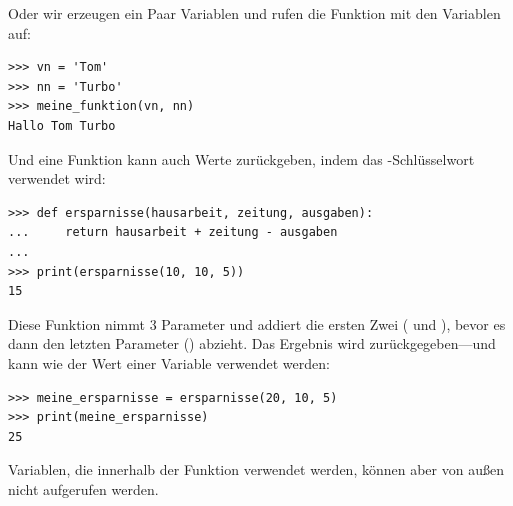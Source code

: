 \noindent
Oder wir erzeugen ein Paar Variablen und rufen die Funktion mit den Variablen auf:

\begin{Verbatim}[frame=single]
>>> vn = 'Tom'
>>> nn = 'Turbo'
>>> meine_funktion(vn, nn)
Hallo Tom Turbo
\end{Verbatim}

\noindent
Und eine Funktion kann auch Werte zurückgeben, indem das -Schlüsselwort verwendet wird:

\begin{Verbatim}[frame=single]
>>> def ersparnisse(hausarbeit, zeitung, ausgaben):
...     return hausarbeit + zeitung - ausgaben
...
>>> print(ersparnisse(10, 10, 5))
15
\end{Verbatim}

Diese Funktion nimmt 3 Parameter und addiert die ersten Zwei ( und ), bevor es dann den letzten Parameter () abzieht. Das Ergebnis wird zurückgegeben---und kann wie der Wert einer Variable verwendet werden:

\begin{Verbatim}[frame=single]
>>> meine_ersparnisse = ersparnisse(20, 10, 5)
>>> print(meine_ersparnisse)
25
\end{Verbatim}

\noindent
Variablen, die innerhalb der Funktion verwendet werden, können aber von außen nicht aufgerufen werden.

